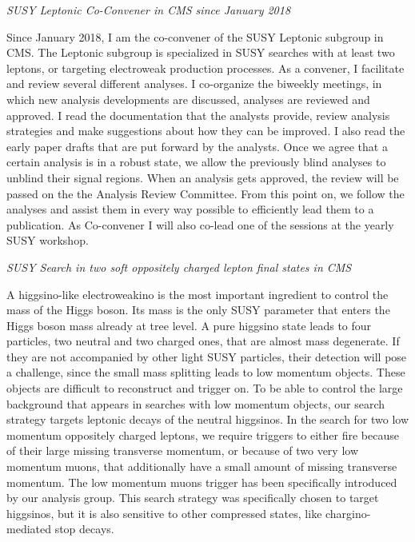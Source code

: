 \documentclass[]{cv} %
\begin{document}
\begin{statement}
\vspace{15pt}
\Large{}
\textit{SUSY Leptonic Co-Convener in CMS since January 2018}
\normalsize{}

Since January 2018, I am the co-convener of the SUSY Leptonic subgroup in CMS.
The Leptonic subgroup is specialized in SUSY searches with at least two leptons,
or targeting electroweak production processes. As a convener, I facilitate and
review several different analyses. I co-organize the biweekly meetings, in which
new analysis developments are discussed, analyses are reviewed and approved. I
read the documentation that the analysts provide, review analysis strategies and
make suggestions about how they can be improved. I also read the early paper
drafts that are put forward by the analysts. Once we agree that a certain
analysis is in a robust state, we allow the previously blind analyses to unblind
their signal regions. When an analysis gets approved, the review will be passed
on the the Analysis Review Committee. From this point on, we follow the analyses
and assist them in every way possible to efficiently lead them to a publication.
As Co-convener I will also co-lead one of the sessions at the yearly SUSY
workshop.

\vspace{15pt}
\Large{}
\textit{SUSY Search in two soft oppositely charged lepton final states in CMS}
\normalsize{}

A higgsino-like electroweakino is the most important ingredient to control the
mass of the Higgs boson. Its mass is the only SUSY parameter that enters the
Higgs boson mass already at tree level. A pure higgsino state leads to four
particles, two neutral and two charged ones, that are almost mass degenerate. If
they are not accompanied by other light SUSY particles, their detection will
pose a challenge, since the small mass splitting leads to low momentum objects.
These objects are difficult to reconstruct and trigger on. To be able to control
the large background that appears in searches with low momentum objects, our
search strategy targets leptonic decays of the neutral higgsinos. In the search
for two low momentum oppositely charged leptons, we require triggers to either
fire because of their large missing transverse momentum, or because of two very
low momentum muons, that additionally have a small amount of missing transverse
momentum. The low momentum muons trigger has been specifically introduced by our
analysis group. This search strategy was specifically chosen to target
higgsinos, but it is also sensitive to other compressed states, like
chargino-mediated stop decays.


\end{statement}
\end{document}
